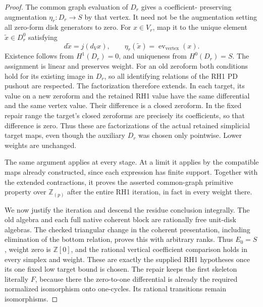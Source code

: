 \begin{proof}
The common graph evaluation of \(D_r\) gives a coefficient-
preserving augmentation \(\eta_r:D_r\to S\) by that
vertex. It need not be the augmentation setting all zero-form
disk generators to zero. For \(x\in V_r\), map it to
the unique element \(\widetilde x\in D_r^0\) satisfying
\[
       d\widetilde x=j(d_Vx),\qquad
       \eta_r(\widetilde x)=\operatorname{ev}_{\mathrm{vertex}}(x).
                                                               \tag{136.FC15}
\]
Existence follows from \(H^1(D_r)=0\), and uniqueness from
\(H^0(D_r)=S\). The assignment is linear and preserves
weight. For an old zeroform both conditions hold for its existing
image in \(D_r\), so all identifying relations of the RH1
PD pushout are respected. The factorization therefore extends.
In each target, its value on a new zeroform and the retained RH1
value have the same differential and the same vertex value.
Their difference is a closed zeroform. In the fixed repair range
the target's closed zeroforms are precisely its coefficients,
so that difference is zero. Thus these are factorizations of the
actual retained simplicial target maps, even though the auxiliary
\(D_r\) was chosen only pointwise. Lower weights are unchanged.

The same argument applies at every stage. At a limit it applies
by the compatible maps already constructed, since each expression
has finite support. Together with the extended contractions, it
proves the asserted common-graph primitive property over
\(\mathbb Z_{(p)}\) after the entire RH1 iteration, in fact
in every weight there.

We now justify the iteration and descend the residue conclusion
integrally. The old algebra and each full native coherent block
are rationally free unit-disk algebras. The checked triangular
change in the coherent presentation, including elimination of
the bottom relation, proves this with arbitrary ranks. Thus
\(E_0=S\), weight zero is \(\mathbb Z[0]\), and the
rational vertical coefficient comparison holds in every simplex
and weight. These are exactly the supplied RH1 hypotheses once
its one fixed low target bound is chosen. The repair keeps the
first skeleton literally \(F\), because there the zero-to-one
differential is already the required normalized isomorphism onto
one-cycles. Its rational transitions remain isomorphisms.


\end{proof}
